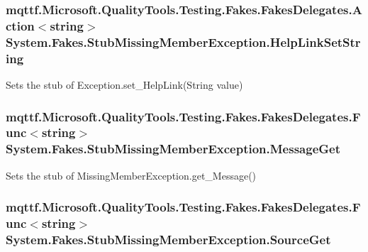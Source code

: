 \hypertarget{class_system_1_1_fakes_1_1_stub_missing_member_exception_a69763328ffc3aea2fb6e02c0e23f6cc1}{
\subsubsection[{Help\-Link\-Set\-String}]{\setlength{\rightskip}{0pt plus 5cm}mqttf.\-Microsoft.\-Quality\-Tools.\-Testing.\-Fakes.\-Fakes\-Delegates.\-Action$<$string$>$ System.\-Fakes.\-Stub\-Missing\-Member\-Exception.\-Help\-Link\-Set\-String}}\label{class_system_1_1_fakes_1_1_stub_missing_member_exception_a69763328ffc3aea2fb6e02c0e23f6cc1}


Sets the stub of Exception.\-set\-\_\-\-Help\-Link(\-String value)

\hypertarget{class_system_1_1_fakes_1_1_stub_missing_member_exception_a75b800fc5f536649bbafb0e673e11ea7}{
\subsubsection[{Message\-Get}]{\setlength{\rightskip}{0pt plus 5cm}mqttf.\-Microsoft.\-Quality\-Tools.\-Testing.\-Fakes.\-Fakes\-Delegates.\-Func$<$string$>$ System.\-Fakes.\-Stub\-Missing\-Member\-Exception.\-Message\-Get}}\label{class_system_1_1_fakes_1_1_stub_missing_member_exception_a75b800fc5f536649bbafb0e673e11ea7}


Sets the stub of Missing\-Member\-Exception.\-get\-\_\-\-Message()

\hypertarget{class_system_1_1_fakes_1_1_stub_missing_member_exception_a4cbfa7a14df58a52470b7b51cec38220}{
\subsubsection[{Source\-Get}]{\setlength{\rightskip}{0pt plus 5cm}mqttf.\-Microsoft.\-Quality\-Tools.\-Testing.\-Fakes.\-Fakes\-Delegates.\-Func$<$string$>$ System.\-Fakes.\-Stub\-Missing\-Member\-Exception.\-Source\-Get}}\label{class_system_1_1_fakes_1_1_stub_missing_member_exception_a4cbfa7a14df58a52470b7b51cec38220}


